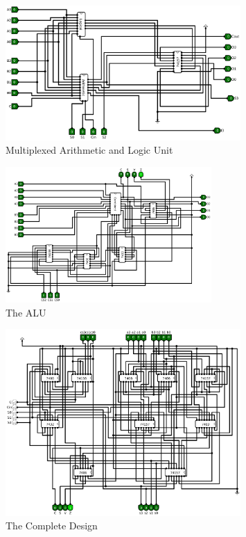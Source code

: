 \documentclass[12pt]{article}
\begin{document}
     \begin{figure}[H]
         \centering
         \includegraphics[width=0.8\textwidth]{Combined1.png}
         \caption{Multiplexed Arithmetic and Logic Unit}
         \label{fig:alu_d}
     \end{figure}

     \begin{figure}[H]
         \centering
         \includegraphics[width=0.7\textwidth]{ALU.png}
         \caption{The ALU}
         \label{fig:alu_e}
     \end{figure}



\begin{figure}[H]
    \centering
    \includegraphics[width=0.8\textwidth]{combined.png}
    \caption{The Complete Design}
    \label{fig:comb}
\end{figure}
\end{document}
